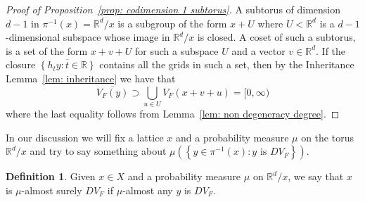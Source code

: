 \documentclass[reqno,11pt, twoside]{amsart}
\theoremstyle{plain}
\theoremstyle{definition}
\newtheorem{defn}[thm]{Definition}
\theoremstyle{definition}
\theoremstyle{remark}
\numberwithin{equation}{section}
\newcommand{\bR}{\mathbb{R}}
\newcommand\seta[1]{\left\{#1\right\}}
\newcommand\pa[1]{\left(#1\right)}
\begin{document}
\begin{proof}[Proof of Proposition~\ref{prop: codimension 1 subtorus}]
    A subtorus of dimension $d-1$ in $\pi^{-1}(x)=\bR^d/x$ 
    is a subgroup of the form $x+U$ where $U<\bR^d$ is a $d-1$-dimensional 
    subspace whose image in $\bR^d/x$ is closed. A coset of such a subtorus, is a set of the form $x+v +U$ for such a subspace $U$ and a vector $v\in \bR^d$. If the closure $\overline{\seta{h_ty:t\in \bR}}$ contains 
    all the grids in such a set, then by the Inheritance 
    Lemma~\ref{lem: inheritance} we have that 
    $$\overline{V_F(y)}\supset \bigcup_{u\in U}V_{F}(x+v+u)=[0,\infty)$$
    where the last equality follows from Lemma~\ref{lem: non degeneracy degree}.
\end{proof}


In our discussion we will fix a lattice $x$ and a probability measure 
$\mu$ on the torus $\bR^d/x$ and try to say something about 
$\mu\pa{\seta{y\in \pi^{-1}(x): y \textrm{ is }DV_F}}$. 
\begin{defn}
    \label{def: a.s.dv}
    Given $x\in X$ and a probability measure $\mu$ on $\bR^d/x$, we say that $x$ is $\mu$-almost surely $DV_F$ if $\mu$-almost any $y$ is $DV_F$. 
\end{defn}
\end{document}
